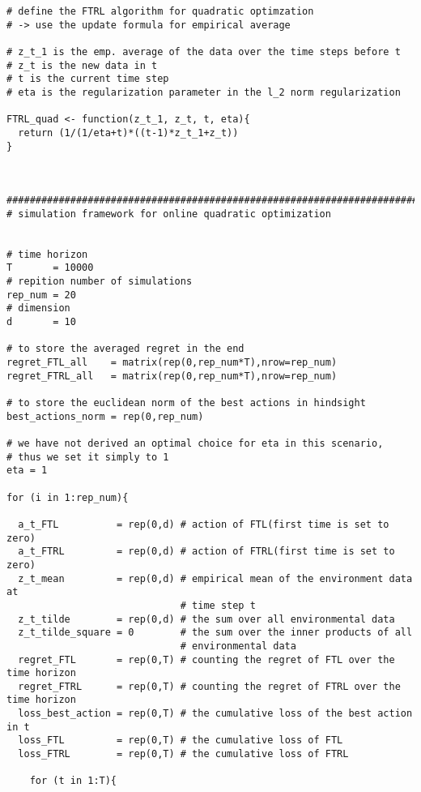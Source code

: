 \documentclass[a4paper]{article}
\begin{document}
{\begin{lstlisting}
# define the FTRL algorithm for quadratic optimzation
# -> use the update formula for empirical average

# z_t_1 is the emp. average of the data over the time steps before t
# z_t is the new data in t 
# t is the current time step
# eta is the regularization parameter in the l_2 norm regularization

FTRL_quad <- function(z_t_1, z_t, t, eta){
  return (1/(1/eta+t)*((t-1)*z_t_1+z_t))
}



###############################################################################
# simulation framework for online quadratic optimization


# time horizon
T       = 10000
# repition number of simulations
rep_num = 20
# dimension
d       = 10

# to store the averaged regret in the end
regret_FTL_all    = matrix(rep(0,rep_num*T),nrow=rep_num)
regret_FTRL_all   = matrix(rep(0,rep_num*T),nrow=rep_num)

# to store the euclidean norm of the best actions in hindsight
best_actions_norm = rep(0,rep_num)

# we have not derived an optimal choice for eta in this scenario, 
# thus we set it simply to 1
eta = 1

for (i in 1:rep_num){ 
  
  a_t_FTL          = rep(0,d) # action of FTL(first time is set to zero)
  a_t_FTRL         = rep(0,d) # action of FTRL(first time is set to zero)
  z_t_mean         = rep(0,d) # empirical mean of the environment data at 
                              # time step t
  z_t_tilde        = rep(0,d) # the sum over all environmental data
  z_t_tilde_square = 0        # the sum over the inner products of all 
                              # environmental data
  regret_FTL       = rep(0,T) # counting the regret of FTL over the time horizon 
  regret_FTRL      = rep(0,T) # counting the regret of FTRL over the time horizon
  loss_best_action = rep(0,T) # the cumulative loss of the best action in t
  loss_FTL         = rep(0,T) # the cumulative loss of FTL 
  loss_FTRL        = rep(0,T) # the cumulative loss of FTRL 
      
    for (t in 1:T){
      

\end{lstlisting}}
\end{document}
